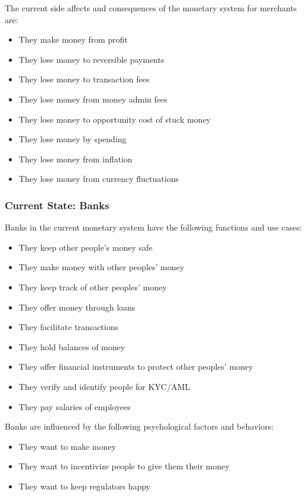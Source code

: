 \documentclass[a4paper,12pt]{article} %
\begin{document}
{The current side affects and consequences of the monetary system for merchants are:

\begin{itemize}
	\item They make money from profit
	\item They lose money to reversible payments
	\item They lose money to transaction fees
	\item They lose money from money admin fees
	\item They lose money to opportunity cost of stuck money
	\item They lose money by spending
	\item They lose money from inflation
	\item They lose money from currency fluctuations
\end{itemize}

\subsubsection{Current State: Banks} \label{sssec:4.3:banks}

Banks in the current monetary system have the following functions and use cases:

\begin{itemize}
	\item They keep other people's money safe
	\item They make money with other peoples' money
	\item They keep track of other peoples' money
	\item They offer money through loans
	\item They facilitate transactions
	\item They hold balances of money
	\item They offer financial instruments to protect other peoples' money
	\item They verify and identify people for KYC/AML
	\item They pay salaries of employees
\end{itemize}

Banks are influenced by the following psychological factors and behaviors:

\begin{itemize}
	\item They want to make money
	\item They want to incentivize people to give them their money
	\item They want to keep regulators happy
\end{itemize}

}
\end{document}
